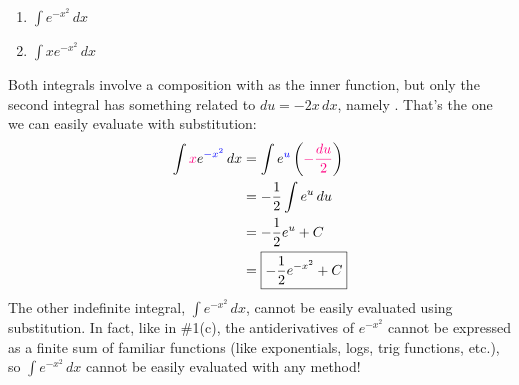 \documentclass[main]{subfiles}
\begin{document}
\begin{enumerate}
\begin{problem}[\vfill]
      \begin{enumerate}
      \item $\displaystyle \int e^{-x^2}\,dx$
      \item $\displaystyle \int xe^{-x^2}\,dx$
      \end{enumerate}
    
  \end{problem}

  \begin{solution}
    Both integrals involve a composition with  as the
    inner function, but only the second integral has something related to
    $du = - 2x\,dx$, namely .  That's the
    one we can easily evaluate with substitution: 
    \begin{align*}
      \int \subd{x}e^{\sub{-x^2}}\,dx &= \int e^\sub{u} \left( \subd{-
          \frac{du}{2}} \right) \\
      &= - \frac{1}{2} \int e^u\,du \\
      &= - \frac{1}{2} e^u + C \\
      &= \boxed{- \frac{1}{2} e^{-x^2} + C}
    \end{align*}
    The other indefinite integral, $\displaystyle \int e^{-x^2}\,dx$,
    cannot be easily evaluated using substitution.  In fact, like in
    {{{{\#1}}(c)}}, the antiderivatives of
    $e^{-x^2}$ cannot be expressed as a finite sum of familiar functions
    (like exponentials, logs, trig functions, etc.), so $\displaystyle
    \int e^{-x^2}\,dx$ cannot  be easily evaluated with any method!
  \end{solution}




\end{enumerate}
\end{document}
